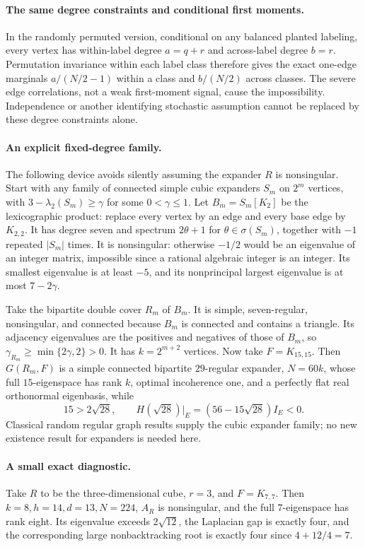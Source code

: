 \documentclass[11pt]{article}
\begin{document}
\paragraph{The same degree constraints and conditional first moments.}
In the randomly permuted version, conditional on any balanced planted
labeling, every vertex has within-label degree $a=q+r$ and across-label
degree $b=r$. Permutation invariance within each label class therefore gives
the exact one-edge marginals $a/(N/2-1)$ within a class and $b/(N/2)$ across
classes. The severe edge correlations, not a weak first-moment signal,
cause the impossibility. Independence or another identifying stochastic
assumption cannot be replaced by these degree constraints alone.

\paragraph{An explicit fixed-degree family.}
The following device avoids silently assuming the expander $R$ is
nonsingular. Start with any family of connected simple cubic expanders
$S_m$ on $2^m$ vertices, with $3-\lambda_2(S_m)\geq\gamma$ for some
$0<\gamma\leq1$.
Let $B_m=S_m[K_2]$ be the lexicographic product: replace every vertex by
an edge and every base edge by $K_{2,2}$. It has degree seven and spectrum
$2\theta+1$ for $\theta\in\sigma(S_m)$, together with $-1$ repeated
$|S_m|$ times. It is nonsingular: otherwise $-1/2$ would be an eigenvalue
of an integer matrix, impossible since a rational algebraic integer is an
integer. Its smallest eigenvalue is at least $-5$, and its nonprincipal
largest eigenvalue is at most $7-2\gamma$.

Take the bipartite double cover $R_m$ of $B_m$. It is simple, seven-regular,
nonsingular, and connected because $B_m$ is connected and contains a
triangle. Its adjacency eigenvalues are the positives and negatives of
those of $B_m$, so
$\gamma_{R_m}\geq\min\{2\gamma,2\}>0$.
It has $k=2^{m+2}$ vertices. Now take $F=K_{15,15}$. Then $G(R_m,F)$ is a
simple connected bipartite $29$-regular expander, $N=60k$, whose full
$15$-eigenspace has rank $k$, optimal incoherence one, and a perfectly flat
real orthonormal eigenbasis, while
\[
 15>2\sqrt{28},\qquad
 H(\sqrt{28})|_E=(56-15\sqrt{28})I_E<0.
\]
Classical random regular graph results supply the cubic expander family;
no new existence result for expanders is needed here.

\paragraph{A small exact diagnostic.}
Take $R$ to be the three-dimensional cube, $r=3$, and $F=K_{7,7}$.
Then $k=8,h=14,d=13,N=224$, $A_R$ is nonsingular, and the full
$7$-eigenspace has rank eight. Its eigenvalue exceeds $2\sqrt{12}$,
the Laplacian gap is exactly four, and the corresponding large
nonbacktracking root is exactly four since $4+12/4=7$.
\end{document}
